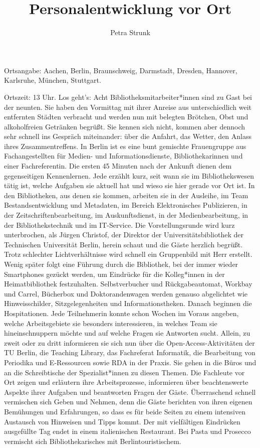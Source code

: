 \documentclass[a4paper,
fontsize=11pt,
oneside,
numbers=noperiodatend,
parskip=half-,
bibliography=totoc,
final
]{scrartcl}
\title{\LARGE{Personalentwicklung vor Ort}} %
\author{Petra Strunk} %
\date{}
\begin{document}
\maketitle
\thispagestyle{fancyplain} 


Ortsangabe: Aachen, Berlin, Braunschweig, Darmstadt, Dresden, Hannover,
Karlsruhe, München, Stuttgart.

Ortszeit: 13 Uhr. Los geht's: Acht Bibliotheksmitarbeiter*innen sind zu
Gast bei der neunten. Sie haben den Vormittag mit ihrer Anreise aus
unterschiedlich weit entfernten Städten verbracht und werden nun mit
belegten Brötchen, Obst und alkoholfreien Getränken begrüßt. Sie kennen
sich nicht, kommen aber dennoch sehr schnell ins Gespräch miteinander:
über die Anfahrt, das Wetter, den Anlass ihres Zusammentreffens. In
Berlin ist es eine bunt gemischte Frauengruppe aus Fachangestellten für
Medien- und Informationsdienste, Bibliothekarinnen und einer
Fachreferentin. Die ersten 45 Minuten nach der Ankunft dienen dem
gegenseitigen Kennenlernen. Jede erzählt kurz, seit wann sie im
Bibliothekswesen tätig ist, welche Aufgaben sie aktuell hat und wieso
sie hier gerade vor Ort ist. In den Bibliotheken, aus denen sie kommen,
arbeiten sie in der Ausleihe, im Team Bestandsentwicklung und Metadaten,
im Bereich Elektronisches Publizieren, in der Zeitschriftenbearbeitung,
im Auskunftsdienst, in der Medienbearbeitung, in der Bibliothekstechnik
und im IT-Service. Die Vorstellungsrunde wird kurz unterbrochen, als
Jürgen Christof, der Direktor der Universitätsbibliothek der Technischen
Universität Berlin, herein schaut und die Gäste herzlich begrüßt. Trotz
schlechter Lichtverhältnisse wird schnell ein Gruppenbild mit Herr
erstellt. Wenig später folgt eine Führung durch die Bibliothek, bei der
immer wieder Smartphones gezückt werden, um Eindrücke für die
Kolleg*innen in der Heimatbibliothek festzuhalten. Selbstverbucher und
Rückgabeautomat, Workbay und Carrel, Bücherbox und Doktorandenwagen
werden genauso abgelichtet wie Hinweisschilder, Sitzgelegenheiten und
Informationstheken. Danach beginnen die Hospitationen. Jede Teilnehmerin
konnte schon Wochen im Voraus angeben, welche Arbeitsgebiete sie
besonders interessieren, in welches Team sie hineinschnuppern möchte und
auf welche Fragen sie Antworten sucht. Allein, zu zweit oder zu dritt
informieren sie sich nun über die Open-Access-Aktivitäten der TU Berlin,
die Teaching Library, das Fachreferat Informatik, die Bearbeitung von
Periodika und E-Ressourcen sowie RDA in der Praxis. Sie gehen in die
Büros und an die Schreibtische der Spezialist*innen zu diesen Themen.
Die Fachleute vor Ort zeigen und erläutern ihre Arbeitsprozesse,
informieren über beachtenswerte Aspekte ihrer Aufgaben und beantworten
Fragen der Gäste. Überraschend schnell vermischen sich Geben und Nehmen,
denn die Gäste berichten von ihren eigenen Bemühungen und Erfahrungen,
so dass es für beide Seiten zu einem intensiven Austausch von Hinweisen
und Tipps kommt. Der mit vielfältigen Eindrücken ausgefüllte Tag endet
in einem italienischen Restaurant. Bei Pasta und Prosecco vermischt sich
Bibliothekarisches mit Berlintouristischem.
\end{document}
